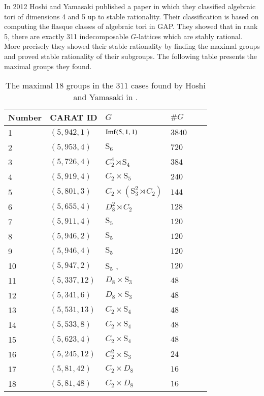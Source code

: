 \documentclass[a4paper, 14pt]{extarticle}
\theoremstyle{plain}
\theoremstyle{definition}
\begin{document}
In 2012 Hoshi and Yamasaki published a paper \cite{Hoshi} in which they 
classified algebraic tori of dimensions 4 and 5 up to stable rationality. 
Their classification is based on computing the flasque classes of algebraic 
tori in GAP. They showed that in rank 5,  there are exactly 311 indecomposable 
$G$-lattices which are stably rational.  More precisely they showed their 
stable rationality by finding the maximal groups and proved stable rationality 
of their subgroups. The following table presents the maximal groups they found.

\begin{table}[H]
\centering
\begin{tabular}{llllll} 
Number & CARAT ID & $G$ & $\#G$\\ \hline
 1  & $(5,942,1)$ & ${\rm Imf}(5,1,1)$ & $3840$\\
2  & $(5,953,4)$ & $\mathrm{S}_6$ & $720$ \\
3  & $(5,726,4)$ & $C_2^4\rtimes \mathrm{S}_4$ & $384$  \\
4  & $(5,919,4)$ & $C_2\times \mathrm{S}_5$ & $240$ \\
5 & $(5,801,3)$ & $C_2\times (\mathrm{S}_3^2\rtimes C_2)$ & $144$ \\
6 & $(5,655,4)$ & $D_8^2\rtimes C_2$ & $128$ \\
7  & $(5,911,4)$ & $\mathrm{S}_5$ & $120$ \\
8 & $(5,946,2)$ & $\mathrm{S}_5$ & $120$ \\
9 & $(5,946,4)$ & $\mathrm{S}_5$ & $120$ \\
10 & $(5,947,2)$ & $\mathrm{S}_5$ ,\,\,\,\,\,\,\,\,\,\,\,\,\,\,\,\,\,\,\,\,\,\,\,\,\,\,\,\,\,\ & $120$ \\
11 & $(5,337,12)$ & $D_8\times \mathrm{S}_3$ & $48$ \\
12  & $(5,341,6)$ & $D_8\times \mathrm{S}_3$ & $48$ \\
13  & $(5,531,13)$ & $C_2\times \mathrm{S}_4$ & $48$ \\
14  & $(5,533,8)$ & $C_2\times \mathrm{S}_4$ & $48$ \\
15 & $(5,623,4)$ & $C_2\times \mathrm{S}_4$ & $48$\\
16   & $(5,245,12)$ & $C_2^2\times \mathrm{S}_3$ & $24$\\
17  & $(5,81,42)$ & $C_2\times D_8$ & $16$ \\
18  & $(5,81,48)$ & $C_2\times D_8$ & $16$ \\
\end{tabular}
\caption{The maximal $18$ groups 
in the  $311$ cases found by Hoshi and Yamasaki in \cite{Hoshi}.}
\end{table}
\end{document}
